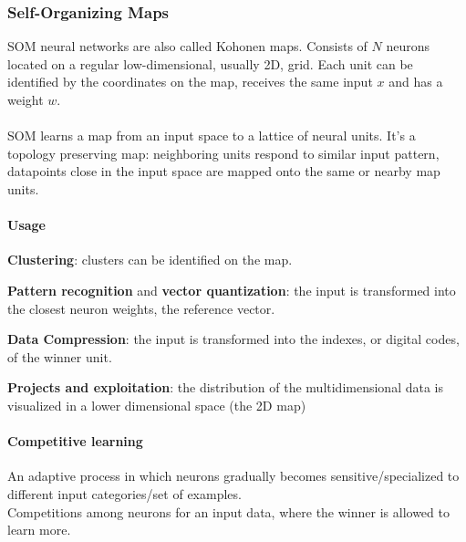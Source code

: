 \documentclass[10pt]{report}
\begin{document}
\subsubsection{Self-Organizing Maps} SOM neural networks are also called Kohonen maps. Consists of $N$ neurons located on a regular low-dimensional, usually 2D, grid. Each unit can be identified by the coordinates on the map, receives the same input $x$ and has a weight $w$.\\\\
SOM learns a map from an input space to a lattice of neural units. It's a topology preserving map: neighboring units respond to similar input pattern, datapoints close in the input space are mapped onto the same or nearby map units.
\paragraph{Usage} \begin{list}{}{}
	\item \textbf{Clustering}: clusters can be identified on the map.
	\item \textbf{Pattern recognition} and \textbf{vector quantization}: the input is transformed into the closest neuron weights, the reference vector.
	\item \textbf{Data Compression}: the input is transformed into the indexes, or digital codes, of the winner unit.
	\item \textbf{Projects and exploitation}: the distribution of the multidimensional data is visualized in a lower dimensional space (the 2D map)
\end{list}
\paragraph{Competitive learning} An adaptive process in which neurons gradually becomes sensitive/specialized to different input categories/set of examples.\\
Competitions among neurons for an input data, where the winner is allowed to learn more.
\end{document}
